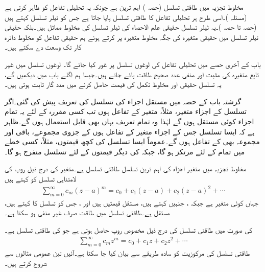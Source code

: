 مخلوط تجزیہ میں طاقتی تسلسل (حصہ )  اہم ترین ہے چونکہ یہ تحلیلی تفاعل کو ظاہر کرتی ہے (مسئلہ )۔اسی طرح ہر تحلیلی تفاعل کا طاقتی تسلسل پایا جاتا ہے جس کو ٹیلر تسلسل کہتے ہیں (حصہ  تا حصہ )۔یہ  ٹیلر تسلسل حقیقی علم الاحصاء کی ٹیلر تسلسل کی مخلوط مماثل ہیں۔بلکہ حقیقی ٹیلر تسلسل میں حقیقی متغیرہ کی جگہ مخلوط متغیرہ پر کرتے ہوئے ہم حقیقی تفاعل کو مخلوط دائرہ کار تک وسعت دے سکتے ہیں۔

باب کے آخری حصے میں تحلیلی تفاعل کی لوغوں تسلسل پر غور کیا جائے گا۔ لوغوں تسلسل میں غیر تابع متغیرہ کی مثبت اور منفی عدد صحیح طاقت پائے جاتے ہیں۔جیسا ہم اگلے باب میں دیکھیں گے، یہ تسلسل حقیقی اور مخلوط تکمل کی قیمت حاصل کرنے میں مدد گار ثابت ہوتی ہیں۔

گزشتہ باب کے حصہ  میں مستقل اجزاء کی تسلسل کی تعریف پیش کی گئی۔اگر تسلسل کے اجزاء متغیر، مثلاً، متغیر  کے تفاعل  ہوں تب کسی مقررہ  کے لئے یہ تمام اجزاء کوئی مستقل ہوں گے لہٰذا وہ تمام تعریف یہاں بھی قابل استعمال ہوں گے۔ظاہر ہے کہ ایسا تسلسل جس کے اجزاء متغیر  کے تفاعل ہوں کے جزوی مجموعے، باقی اور مجموعہ بھی  کے تفاعل ہوں گے۔عموماً ایسا تسلسل  کی کچھ قیمتوں، مثلاً، کسی خطے میں تمام   کے لئے مرتکز ہو گا، جبکہ  کی دیگر قیمتوں کے لئے تسلسل منفرج ہو گا۔ 

مخلوط تجزیہ میں متغیر اجزاء کی اہم ترین تسلسل طاقتی تسلسل ہے۔متغیر   کی   درج ذیل روپ کی لامتناہی تسلسل کو کہتے ہیں
\begin{align}\label{مساوات_ٹیلر_طاقتی_تسلسل_الف}
\sum\limits_{m=0}^{\infty} c_m(z-a)^m=c_0+c_1(z-a)+c_2(z-a)^2+\cdots
\end{align}
 جہاں  کوئی متغیر ہے جبکہ ، جنہیں  کہتے ہیں، مستقل قیمتیں ہیں اور ، جس کو تسلسل کا  کہتے ہیں، مستقل ہے۔طاقتی تسلسل  میں طاقت  صرف غیر منفی ہو سکتا ہے۔

 کی صورت میں طاقتی تسلسل کی درج ذیل مخصوص روپ حاصل ہوتی ہے جو  کی طاقتی تسلسل ہے۔
\begin{align}\label{مساوات_ٹیلر_طاقتی_تسلسل_ب}
\sum\limits_{m=0}^{\infty} c_mz^m=c_0+c_1z+c_2z^2+\cdots
\end{align}
 طاقتی تسلسل کی مرکوزیت کو سادہ طریقے سے بیان کیا جا سکتا ہے۔آئیں تین عمومی مثالوں سے شروع کرتے ہیں۔

